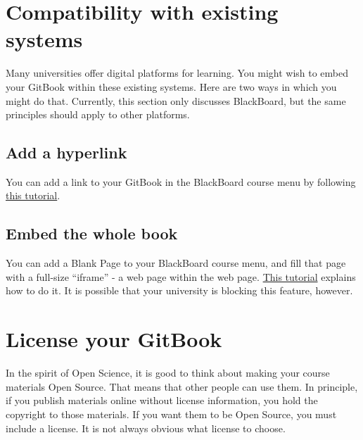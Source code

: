 \documentclass[
]{book}
\begin{document}
\hypertarget{compatibility-with-existing-systems}{%
\chapter{Compatibility with existing systems}\label{compatibility-with-existing-systems}}

Many universities offer digital platforms for learning. You might wish to embed your GitBook within these existing systems. Here are two ways in which you might do that. Currently, this section only discusses BlackBoard, but the same principles should apply to other platforms.

\hypertarget{add-a-hyperlink}{%
\section{Add a hyperlink}\label{add-a-hyperlink}}

You can add a link to your GitBook in the BlackBoard course menu by following \href{https://help.blackboard.com/Learn/Instructor/Course_Content/Create_Content/Create_Course_Materials/Link_to_Websites}{this tutorial}.

\hypertarget{embed-the-whole-book}{%
\section{Embed the whole book}\label{embed-the-whole-book}}

You can add a Blank Page to your BlackBoard course menu, and fill that page with a full-size ``iframe'' - a web page within the web page. \href{https://mycampus.maine.edu/web/uc-faculty-portal/education-technology/-/asset_publisher/vEKuFJYvDY5K/content/inserting-an-iframe-into-blackboard?inheritRedirect=false}{This tutorial} explains how to do it. It is possible that your university is blocking this feature, however.

\hypertarget{license-your-gitbook}{%
\chapter{License your GitBook}\label{license-your-gitbook}}

In the spirit of Open Science, it is good to think about making your course materials Open Source. That means that other people can use them. In principle, if you publish materials online without license information, you hold the copyright to those materials. If you want them to be Open Source, you must include a license. It is not always obvious what license to choose.
\end{document}
